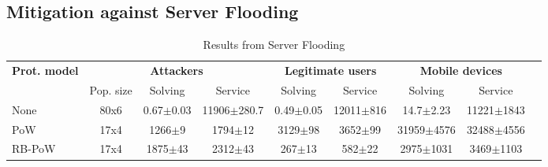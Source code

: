\begin{comment}
  \begin{table}[H]
    \centering
    \tiny
    \begin{tabular}{lcccccccc} \toprule
      \multicolumn{1}{c}{Prot. model} & \multicolumn{3}{c}{Attackers} & \multicolumn{2}{c}{Legitimate users} & \multicolumn{2}{c}{Mobile devices} \\
      \multicolumn{1}{c}{} & \multicolumn{1}{c}{Pop. size} & \multicolumn{1}{c}{Solving} & \multicolumn{1}{c}{Service} & \multicolumn{1}{c}{Solving} & \multicolumn{1}{c}{Service} & \multicolumn{1}{c}{Solving} & \multicolumn{1}{c}{Service}  \\ \toprule
      None & 120x7  & 0.57$\pm$0.02 &  19861.19$\pm$375.23 & 0.48$\pm$0.05 & 19965.45$\pm$1286.18 & 16.87$\pm$7.64 & 20800.60$\pm$3202.62     \\ \bottomrule
    \end{tabular}

    \caption{No protection}\label{tab:noprot}

  \end{table}
\end{comment}

\subsection{Mitigation against Server Flooding}
  \begin{table}[H]
    \centering
    \tiny
    \caption{Results from Server Flooding}\label{tab:flooding}

    \begin{tabular}{lcccccccc} \toprule
      \multicolumn{1}{c}{\textbf{Prot. model}} & \multicolumn{3}{c}{\textbf{Attackers}} & \multicolumn{2}{c}{\textbf{Legitimate users}} & \multicolumn{2}{c}{\textbf{Mobile devices}} \\
      \multicolumn{1}{c}{} & \multicolumn{1}{c}{Pop. size} & \multicolumn{1}{c}{Solving} & \multicolumn{1}{c}{Service} & \multicolumn{1}{c}{Solving} & \multicolumn{1}{c}{Service} & \multicolumn{1}{c}{Solving} & \multicolumn{1}{c}{Service}  \\ \toprule
       None & 80x6  & 0.67$\pm$0.03 &  11906$\pm$280.7 & 0.49$\pm$0.05 & 12011$\pm$816 & 14.7$\pm$2.23 & 11221$\pm$1843     \\ 
      PoW & 17x4  & 1266$\pm$9 & 1794$\pm$12 & 3129$\pm$98 & 3652$\pm$99 & 31959$\pm$4576 & 32488$\pm$4556    \\
      RB-PoW & 17x4 & 1875$\pm$43 & 2312$\pm$43 & 267$\pm$13 & 582$\pm$22 & 2975$\pm$1031 & 3469$\pm$1103   \\ \bottomrule
    \end{tabular}

  \end{table}



